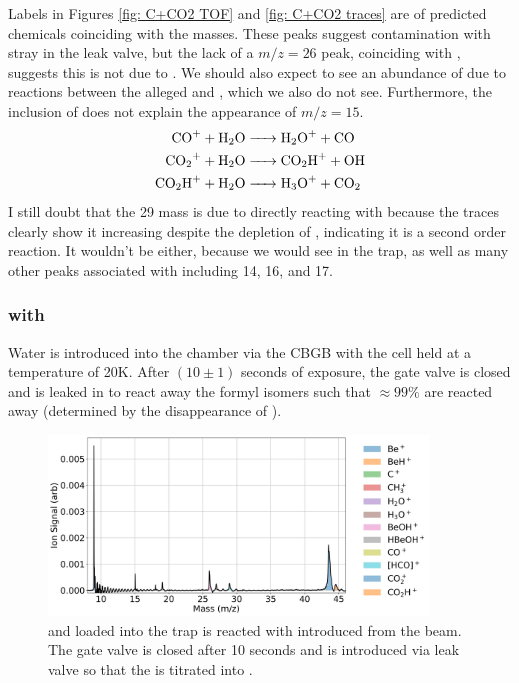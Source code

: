 Labels in Figures \ref{fig: C+CO2 TOF} and \ref{fig: C+CO2 traces} are of predicted chemicals coinciding with the masses. These peaks suggest contamination with stray  in the leak valve, but the lack of a $m/z=26$ peak, coinciding with , suggests this is not due to . We should also expect to see an abundance of  due to reactions between the alleged \ce{[HCO]+} and , which we also do not see. Furthermore, the inclusion of  does not explain the appearance of $m/z=15$.
\begin{align}
	\ce{CO+ + H2O & -> H2O+ + CO} \\
	\ce{CO2+ + H2O & -> CO2H+ + OH} \label{r: CO2+H2O->CO2H} \\
	\ce{CO2H+ + H2O & -> H3O+ + CO2}
\end{align}
I still doubt that the 29 mass is due to  directly reacting with  because the traces clearly show it increasing despite the depletion of , indicating it is a second order reaction. It wouldn't be  either, because we would see  in the trap, as well as many other peaks associated with  including 14, 16, and 17.

\subsubsection{ with }
Water is introduced into the chamber via the CBGB with the cell held at a temperature of 20K. After $(10 \pm 1)$ seconds of exposure, the gate valve is closed and  is leaked in to react away the formyl isomers such that $\approx 99\%$ are reacted away (determined by the disappearance of ).

\begin{figure}[H]
	\centering
	\includegraphics[width=0.9\textwidth]{images/C_H2O_CO2_titration_TOF.png}
	\caption{ and  loaded into the trap is reacted with  introduced from the beam. The gate valve is closed after 10 seconds and  is introduced via leak valve so that the  is titrated into .}
\end{figure}

